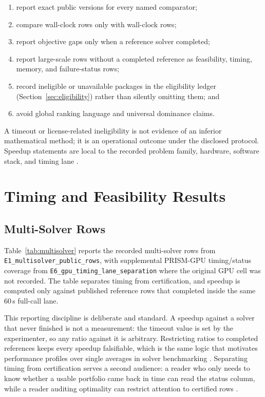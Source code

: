 \documentclass[10pt,a4paper]{extarticle}
\begin{document}
\begin{enumerate}[label=\textbf{E\arabic*.}, leftmargin=2.4em]
  \item report exact public versions for every named comparator;
  \item compare wall-clock rows only with wall-clock rows;
  \item report objective gaps only when a reference solver completed;
  \item report large-scale rows without a completed reference as feasibility,
        timing, memory, and failure-status rows;
  \item record ineligible or unavailable packages in the eligibility ledger
        (Section~\ref{sec:eligibility}) rather than silently omitting them; and
  \item avoid global ranking language and universal dominance claims.
\end{enumerate}

A timeout or license-related ineligibility is not evidence of an inferior
mathematical method; it is an operational outcome under the disclosed
protocol. Speedup statements are local to the recorded problem family,
hardware, software stack, and timing lane
\citep{dolanmore2002,bartz2020benchmarking}.

\section{Timing and Feasibility Results}
\label{sec:solver_results}

\subsection{Multi-Solver Rows}

Table~\ref{tab:multisolver} reports the recorded multi-solver rows from
\texttt{E1\_multisolver\_public\_rows}, with supplemental PRISM-GPU
timing/status coverage from \texttt{E6\_gpu\_timing\_lane\_separation} where
the original GPU cell was not recorded. The table separates timing from
certification, and speedup is computed only against published reference rows
that completed inside the same 60\,s full-call lane.

This reporting discipline is deliberate and standard. A speedup against a
solver that never finished is not a measurement: the timeout value is set by
the experimenter, so any ratio against it is arbitrary. Restricting ratios to
completed references keeps every speedup falsifiable, which is the same logic
that motivates performance profiles over single averages in solver
benchmarking \citep{dolanmore2002}. Separating timing from certification
serves a second audience: a reader who only needs to know whether a usable
portfolio came back in time can read the status column, while a reader
auditing optimality can restrict attention to certified rows
\citep{bartz2020benchmarking}.
\end{document}
